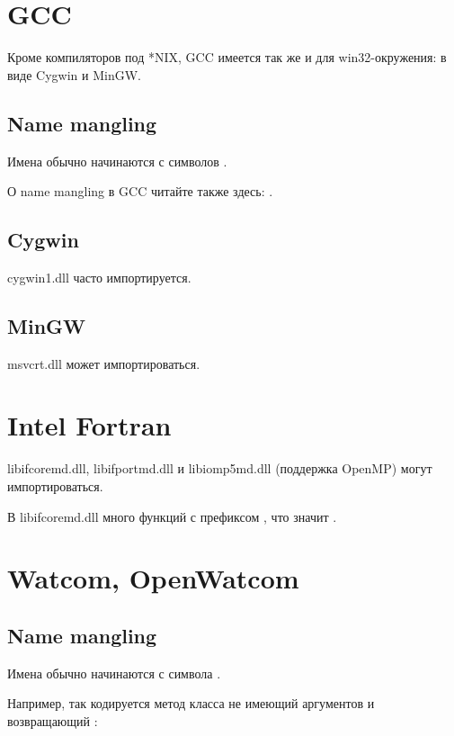 \section{GCC}

Кроме компиляторов под *NIX, GCC имеется так же и для win32-окружения: в виде Cygwin и MinGW.

\subsection{Name mangling}

Имена обычно начинаются с символов .

О \gls{name mangling} в GCC читайте также здесь: .

\subsection{Cygwin}

cygwin1.dll часто импортируется.

\subsection{MinGW}

msvcrt.dll может импортироваться.

\section{Intel Fortran}

libifcoremd.dll, libifportmd.dll и libiomp5md.dll (поддержка OpenMP) могут импортироваться.

В libifcoremd.dll много функций с префиксом , что значит .

\section{Watcom, OpenWatcom}

\subsection{Name mangling}

Имена обычно начинаются с символа .

Например, так кодируется метод  класса  не имеющий аргументов и возвращающий \Tvoid{}:

